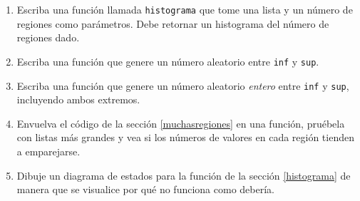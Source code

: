 \begin{enumerate}

 \item Escriba una función llamada \texttt{histograma} que
tome una lista y un número de regiones como parámetros. Debe retornar
un histograma del número de regiones dado.

 \item Escriba una función que genere un número aleatorio entre \texttt{inf} y
\texttt{sup}.
 
 \item Escriba una función que genere un número aleatorio {\em entero}
entre \texttt{inf} y  \texttt{sup}, incluyendo ambos extremos.

 \item Envuelva el código de la sección \ref{muchasregiones} en una función, 
pruébela con listas más grandes y vea si los números
de valores en cada región tienden a emparejarse.

 \item Dibuje un diagrama de estados para la función de la sección \ref{histograma}
  de manera que se visualice por qué no funciona como debería.

\end{enumerate}
